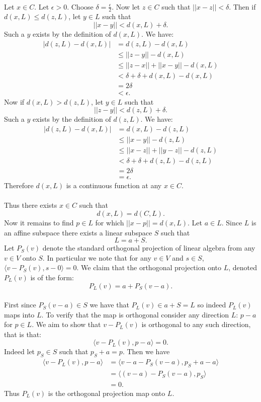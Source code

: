 \documentclass[letterpaper,12pt,oneside,onecolumn]{article}
\begin{document}
\paragraph{}
Let $x \in C$. Let $\epsilon > 0$. Choose $\delta = \frac{\epsilon}{2}$. Now let $z \in C$ such that $||x - z || < \delta$. Then if $d(x,L) \leq d(z,L)$, let $y \in L$ such that $$||x-y|| < d(x,L) + \delta.$$
Such a $y$ exists by the definition of $d(x,L)$. We have:
\begin{align*}
|d(z,L) - d(x,L)|  &= d(z,L) - d(x,L) \\
&\leq ||z-y|| - d(x,L) \\
&\leq ||z-x|| + ||x-y|| - d(x,L) \\
&< \delta + \delta + d(x,L) - d(x,L) \\
&= 2\delta \\
&< \epsilon.
\end{align*}
Now if $d(x,L) > d(z,L)$, let $y \in L$ such that $$||z-y|| < d(z,L) + \delta.$$
Such a $y$ exists by the definition of $d(z,L)$. We have:
\begin{align*}
|d(z,L) - d(x,L)| &= d(x,L) - d(z,L) \\
&\leq ||x-y|| - d(z,L) \\
&\leq ||x-z|| + ||y-z|| - d(z,L) \\
&< \delta + \delta + d(z,L) - d(z,L) \\
&= 2\delta \\
&= \epsilon.
\end{align*}
Therefore $d(x,L)$ is a continuous function at any $x\in C$.
\paragraph{}
Thus there exists $x \in C$ such that $$ d(x,L) = d(C,L).$$ Now it remains to find $p \in L$ for which $||x - p || = d(x,L)$. Let $a \in L$. Since $L$ is an affine subspace there exists a linear subspace $S$ such that $$ L = a + S.$$
Let $P_S(v)$ denote the standard orthogonal projection of linear algebra from any $v \in V$ onto $S$. In particular we note that for any $v \in V$ and $s \in S$, $\langle v - P_S(v), s - 0 \rangle = 0$. We claim that the orthogonal projection onto $L$, denoted $P_L(v)$ is of the form:
$$P_L(v) = a + P_S(v-a).$$
\paragraph{}
First since $P_S(v-a) \in S$ we have that $P_L(v) \in a + S = L$ so indeed $P_L(v)$ maps into $L$. To verify that the map is orthogonal consider any direction $L$: $p -a$ for $p \in L$. We aim to show that $v - P_L(v)$ is orthogonal to any such direction, that is that:
$$\langle v - P_L(v), p -a \rangle = 0.$$
Indeed  let $p_S \in S$ such that $p_S + a = p$. Then we have
\begin{align*}
\langle v- P_L(v), p-a \rangle &= \langle v - a - P_S(v-a), p_S + a - a \rangle \\
&= \langle (v-a) - P_S(v-a), p_S \rangle \\
&= 0.
\end{align*}
Thus $P_L(v)$ is the orthogonal projection map onto $L$.
\end{document}
